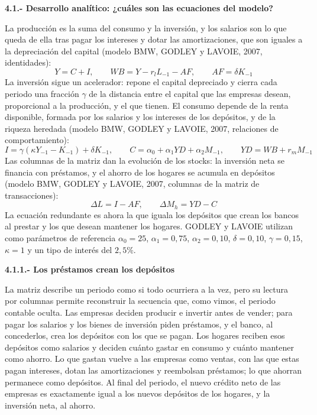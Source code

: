 \documentclass[10pt,a4paper]{article}
\begin{document}
\textbf{4.1.- Desarrollo analítico: ¿cuáles son las ecuaciones del modelo?}

La producción es la suma del consumo y la inversión, y los salarios son lo que queda de ella tras pagar los intereses y dotar las amortizaciones, que son iguales a la depreciación del capital (modelo BMW, GODLEY y LAVOIE, 2007, identidades):
$$Y=C+I,\qquad WB=Y-r_{l}L_{-1}-AF,\qquad AF=\delta K_{-1}$$
La inversión sigue un acelerador: repone el capital depreciado y cierra cada periodo una fracción $\gamma$ de la distancia entre el capital que las empresas desean, proporcional a la producción, y el que tienen. El consumo depende de la renta disponible, formada por los salarios y los intereses de los depósitos, y de la riqueza heredada (modelo BMW, GODLEY y LAVOIE, 2007, relaciones de comportamiento):
$$I=\gamma\left(\kappa Y_{-1}-K_{-1}\right)+\delta K_{-1},\qquad C=\alpha_0+\alpha_1 YD+\alpha_2 M_{-1},\qquad YD=WB+r_{m}M_{-1}$$
Las columnas de la matriz dan la evolución de los stocks: la inversión neta se financia con préstamos, y el ahorro de los hogares se acumula en depósitos (modelo BMW, GODLEY y LAVOIE, 2007, columnas de la matriz de transacciones):
$$\Delta L=I-AF,\qquad \Delta M_h=YD-C$$
La ecuación redundante es ahora la que iguala los depósitos que crean los bancos al prestar y los que desean mantener los hogares. GODLEY y LAVOIE utilizan como parámetros de referencia $\alpha_0=25$, $\alpha_1=0{,}75$, $\alpha_2=0{,}10$, $\delta=0{,}10$, $\gamma=0{,}15$, $\kappa=1$ y un tipo de interés del $2{,}5\%$.

\textbf{4.1.1.- Los préstamos crean los depósitos}

La matriz describe un periodo como si todo ocurriera a la vez, pero su lectura por columnas permite reconstruir la secuencia que, como vimos, el periodo contable oculta. Las empresas deciden producir e invertir antes de vender; para pagar los salarios y los bienes de inversión piden préstamos, y el banco, al concederlos, crea los depósitos con los que se pagan. Los hogares reciben esos depósitos como salarios y deciden cuánto gastar en consumo y cuánto mantener como ahorro. Lo que gastan vuelve a las empresas como ventas, con las que estas pagan intereses, dotan las amortizaciones y reembolsan préstamos; lo que ahorran permanece como depósitos. Al final del periodo, el nuevo crédito neto de las empresas es exactamente igual a los nuevos depósitos de los hogares, y la inversión neta, al ahorro.
\end{document}

